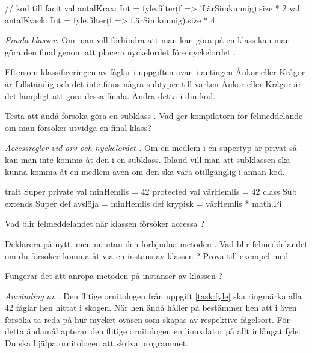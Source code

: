 \begin{Code}
// kod till facit
val antalKrax: Int = fyle.filter(f => !f.ärSimkunnig).size * 2
val antalKvack: Int = fyle.filter(f => f.ärSimkunnig).size * 4
\end{Code}

\Task \emph{Finala klasser.} Om man vill förhindra att man kan göra  på en klass kan man göra den final genom att placera nyckelordet  före nyckelordet .

\Subtask Eftersom klassificeringen av fåglar i uppgiften ovan i antingen Ånkor eller Krågor är fullständig och det inte finns några subtyper till varken Ånkor eller Krågor är det lämpligt att göra dessa finala. Ändra detta i din kod.

\Subtask Testa att ändå försöka göra en subklass . Vad ger kompilatorn för felmeddelande om man försöker utvidga en final klass?   


\Task \emph{Accessregler vid arv och nyckelordet .} Om en medlem i en supertyp är privat så kan man inte komma åt den i en subklass. Ibland vill man att subklassen ska kunna komma åt en medlem även om den ska vara otillgänglig i annan kod. 

\begin{REPL}
trait Super { 
  private val minHemlis = 42
  protected val vårHemlis = 42
}
class Sub extends Super { 
  def avslöja = minHemlis
  def krypisk = vårHemlis * math.Pi
}
\end{REPL} 
  
\Subtask Vad blir felmeddelandet när klassen  försöker accessa ?

\Subtask Deklarera  på nytt, men nu utan den förbjudna metoden . Vad blir felmeddelandet om du försöker komma åt  via en instans av klassen ? Prova till exempel med 

\Subtask Fungerar det att anropa metoden  på instanser av klassen ?

\Task \emph{Använding av .} Den flitige ornitologen från uppgift \ref{task:fyle} ska ringmärka alla 42 fåglar hen hittat i skogen. När hen ändå håller på bestämmer hen att i även försöka ta reda på hur mycket oväsen som skapas av respektive fågelsort. För detta ändamål apterar den flitige ornitologen en linuxdator på allt infångat fyle. Du ska hjälpa ornitologen att skriva programmet. 

